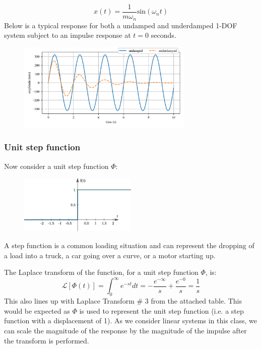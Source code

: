 \documentclass[12pt,letter]{article}
\numberwithin{ex}{section} %
\numberwithin{re}{section} %
\newcommand{\Laplace}[1]{\ensuremath{\mathcal{L}{\left[#1\right]}}}
\begin{document}
\begin{equation}
x(t) = \frac{1}{m \omega_n}\text{sin}(\omega_n t)
\end{equation}
Below is a typical response for both a undamped and underdamped 1-DOF system subject to an impulse response at $t=0$ seconds. 
\begin{figure}[H]
	\centering
	\includegraphics[width=0.75\textwidth]{../Figures/response_impulse.png}
\end{figure}



\subsubsection{Unit step function}
Now consider a unit step function $\Phi$: 

\begin{figure}[H]
	\centering
	\includegraphics[width=0.5\textwidth]{../Figures/unit_step_function.png}
\end{figure}

A step function is a common loading situation and can represent the dropping of a load into a truck, a car going over a curve, or a motor starting up. 


The Laplace transform of the function, for a unit step function $\Phi$, is: 
\begin{equation*}
\Laplace{\Phi(t)} = \int_{0}^{\infty} e^{-st}dt = -\frac{e^{-\infty}}{s} +\frac{e^{-0}}{s} =\frac{1}{s}
\end{equation*}
This also lines up with Laplace Transform \# 3 from the attached table. This would be expected as $\Phi$ is used to represent the unit step function (i.e. a step function with a displacement of 1). As we consider linear systems in this class, we can scale the magnitude of the response by the magnitude of the impulse after the transform is performed. 
\end{document}
